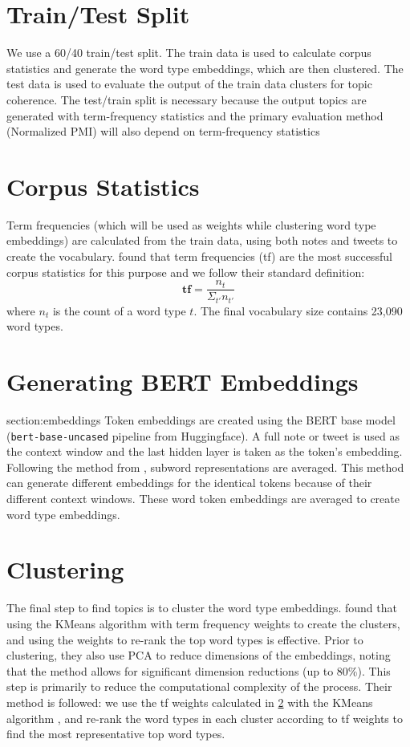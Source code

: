 \documentclass [11pt, proquest] {uwthesis}[2020/02/24]
\begin{document}
\section{Train/Test Split}\label{section:traintest}
We use a 60/40 train/test split. The train data is used to calculate corpus statistics and generate the word type embeddings, which are then clustered. The test data is used to evaluate the output of the train data clusters for topic coherence. The test/train split is necessary because the output topics are generated with term-frequency statistics and the primary evaluation method (Normalized PMI) will also depend on term-frequency statistics

\section{Corpus Statistics}\label{section:corpusstats}
Term frequencies (which will be used as weights while clustering word type embeddings) are calculated from the train data, using both notes and tweets to create the vocabulary. \cite{sia-etal-2020-tired} found that term frequencies (tf) are the most successful corpus statistics for this purpose and we follow their standard definition: $$ \textbf{tf} = \frac{n_t}{\Sigma_{t'}n_{t'}} $$  where $n_t$ is the count of a word type $t$. The final vocabulary size contains 23,090 word types.

\section{Generating BERT Embeddings}{section:embeddings}
Token embeddings are created using the BERT base model \cite{DBLP:journals/corr/abs-1810-04805}  (\verb|bert-base-uncased| pipeline from Huggingface).
A full note or tweet is used as the context window and the last hidden layer is taken as the token’s embedding. Following the method from \cite{sia-etal-2020-tired}, subword representations are averaged. This method can generate different embeddings for the identical tokens because of their different context windows. These word token embeddings are averaged to create word type embeddings.

\section{Clustering}\label{section:clustering}

The final step to find topics is to cluster the word type embeddings. \cite{si-etal-2021-topic} found that using the KMeans algorithm with term frequency weights to create the clusters, and using the weights to re-rank the top word types is effective. Prior to clustering, they also use PCA to reduce dimensions of the embeddings, noting that the method allows for significant dimension reductions (up to 80\%). This step is primarily to reduce the computational complexity of the process. Their method is followed: we use the tf weights calculated in \ref{section:corpusstats} with the KMeans algorithm \citep{scikit-learn}, and re-rank the word types in each cluster according to tf weights to find the most representative top word types.
\end{document}
